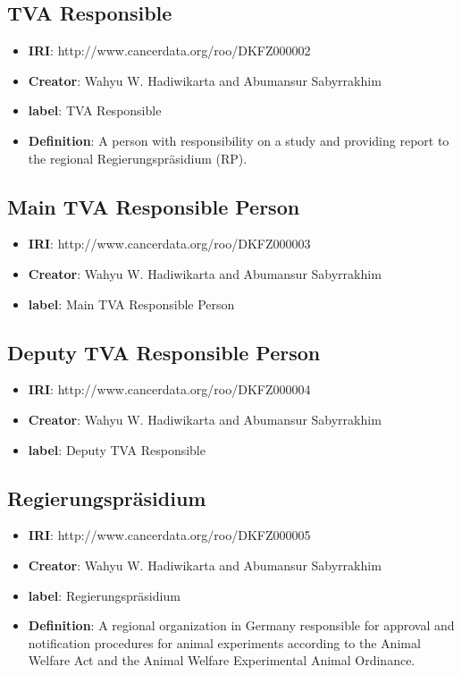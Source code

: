 \documentclass[a4paper,12pt,oneside]{article}
\begin{document}
  \subsection{TVA Responsible}

  \begin{itemize}
      \item \textbf{IRI}: http://www.cancerdata.org/roo/DKFZ000002
      \item \textbf{Creator}: Wahyu W. Hadiwikarta and Abumansur Sabyrrakhim
      \item \textbf{label}: TVA Responsible
       \item \textbf{Definition}: A person with responsibility on a study and providing report to the regional Regierungspräsidium (RP).
  \end{itemize}  

  \subsection{Main TVA Responsible Person}

  \begin{itemize}
      \item \textbf{IRI}: http://www.cancerdata.org/roo/DKFZ000003
      \item \textbf{Creator}: Wahyu W. Hadiwikarta and Abumansur Sabyrrakhim
      \item \textbf{label}: Main TVA Responsible Person
  \end{itemize}  

  \subsection{Deputy TVA Responsible Person}

  \begin{itemize}
      \item \textbf{IRI}: http://www.cancerdata.org/roo/DKFZ000004
      \item \textbf{Creator}: Wahyu W. Hadiwikarta and Abumansur Sabyrrakhim
      \item \textbf{label}: Deputy TVA Responsible
  \end{itemize}  


  \subsection{Regierungspräsidium}

  \begin{itemize}
      \item \textbf{IRI}: http://www.cancerdata.org/roo/DKFZ000005
      \item \textbf{Creator}: Wahyu W. Hadiwikarta and Abumansur Sabyrrakhim
      \item \textbf{label}: Regierungspräsidium
      \item \textbf{Definition}: A regional organization in Germany responsible for approval and notification procedures for animal experiments according to the Animal Welfare Act and the Animal Welfare Experimental Animal Ordinance.
  \end{itemize}  
\end{document}
